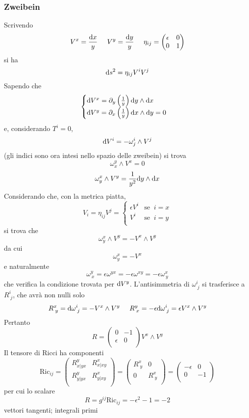 \subsubsection*{Zweibein}
Scrivendo
\[ V^x = \frac{\mathrm{d} x}{y} \;\;\;\;\; V^y = \frac{\mathrm{d} y}{y} \;\;\;\;\; \eta_{ij} = 
	\begin{pmatrix}
		\epsilon & 0 \\
		0        & 1 \\
	\end{pmatrix}
\]
si ha
\[ \mathrm{d} s^2 = \eta_{ij} V^iV^j \]
\newline
Sapendo che 
\[ 	\begin{cases}
	\mathrm{d} V^x = \partial_y \left(\frac{1}{y}\right) \mathrm{d} y \wedge \mathrm{d} x & \\
	\mathrm{d} V^y = \partial_x \left(\frac{1}{y}\right) \mathrm{d} x \wedge \mathrm{d} y = 0  & \\
	\end{cases}
\]
e, considerando \(T^i = 0\), 
\[ \mathrm{d} V^i = -\omega^i_j\wedge V^j \]
(gli indici sono ora intesi nello spazio delle zweibein)
si trova
\[ \omega^y_x \wedge V^x = 0 \]
\[ \omega^x_y \wedge V^y = \frac{1}{y^2} \mathrm{d} y \wedge \mathrm{d} x \]
Considerando che, con la metrica piatta,
\[ V_i = \eta_{ij} V^j = \begin{cases}
	\epsilon V^i & \mathrm{se} \;\; i=x \\
	V^i	     & \mathrm{se} \;\; i=y \\
\end{cases} \]
si trova che 
\[ \omega^x_y \wedge V^y = -V^x\wedge V^y \]
da cui 
\[ \omega^x_y = -V^x \]
e naturalmente
\[ \omega^y_{\,x}= \epsilon\omega^{yx} = -\epsilon\omega^{xy} = -\epsilon\omega^x_{\,y} \]
che verifica la condizione trovata per $\mathrm{d} V^y$.
L'antisimmetria di $\omega^i_{\;j}$ si trasferisce a $R^i_{\;j}$, che avr\`a non nulli solo
\[ R^x_{\;y} = \mathrm{d} \omega^i_{\;j} = -V^x\wedge V^y \;\;\;\;\; R^y_{\;x} = -\epsilon\mathrm{d} \omega^i_{\;j} = \epsilon V^x\wedge V^y \]
Pertanto 
\[ R = \begin{pmatrix}
		0 & -1 \\
		\epsilon & 0 \\
	\end{pmatrix} V^x \wedge V^y \]
Il tensore di Ricci ha componenti
\[ \mathrm{Ric}_{ij} = 
	\begin{pmatrix}
		R^y_{x|yx} & R^x_{x|xy} \\
		R^y_{y|yx} & R^x_{y|xy} \\
	\end{pmatrix}
	= \begin{pmatrix}
		R^x_{\;y} & 0 \\
		0 & R^x_{\;y} \\
	\end{pmatrix}
	= \begin{pmatrix}
		-\epsilon & 0 \\
		0 & -1 \\
	\end{pmatrix}
\]
per cui lo scalare 
\[ R = g^{ij} \mathrm{Ric}_{ij} = -\epsilon^2 -1=-2 \]
\todo vettori tangenti; integrali primi



